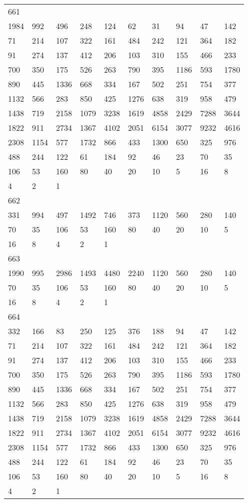 \begin{longtable}{*{10}{l}}
661&&&&&&&&&\\
1984& 992& 496& 248& 124& 62& 31& 94& 47& 142\\
71& 214& 107& 322& 161& 484& 242& 121& 364& 182\\
91& 274& 137& 412& 206& 103& 310& 155& 466& 233\\
700& 350& 175& 526& 263& 790& 395& 1186& 593& 1780\\
890& 445& 1336& 668& 334& 167& 502& 251& 754& 377\\
1132& 566& 283& 850& 425& 1276& 638& 319& 958& 479\\
1438& 719& 2158& 1079& 3238& 1619& 4858& 2429& 7288& 3644\\
1822& 911& 2734& 1367& 4102& 2051& 6154& 3077& 9232& 4616\\
2308& 1154& 577& 1732& 866& 433& 1300& 650& 325& 976\\
488& 244& 122& 61& 184& 92& 46& 23& 70& 35\\
106& 53& 160& 80& 40& 20& 10& 5& 16& 8\\
4& 2& 1& \\

662&&&&&&&&&\\
331& 994& 497& 1492& 746& 373& 1120& 560& 280& 140\\
70& 35& 106& 53& 160& 80& 40& 20& 10& 5\\
16& 8& 4& 2& 1& \\

663&&&&&&&&&\\
1990& 995& 2986& 1493& 4480& 2240& 1120& 560& 280& 140\\
70& 35& 106& 53& 160& 80& 40& 20& 10& 5\\
16& 8& 4& 2& 1& \\

664&&&&&&&&&\\
332& 166& 83& 250& 125& 376& 188& 94& 47& 142\\
71& 214& 107& 322& 161& 484& 242& 121& 364& 182\\
91& 274& 137& 412& 206& 103& 310& 155& 466& 233\\
700& 350& 175& 526& 263& 790& 395& 1186& 593& 1780\\
890& 445& 1336& 668& 334& 167& 502& 251& 754& 377\\
1132& 566& 283& 850& 425& 1276& 638& 319& 958& 479\\
1438& 719& 2158& 1079& 3238& 1619& 4858& 2429& 7288& 3644\\
1822& 911& 2734& 1367& 4102& 2051& 6154& 3077& 9232& 4616\\
2308& 1154& 577& 1732& 866& 433& 1300& 650& 325& 976\\
488& 244& 122& 61& 184& 92& 46& 23& 70& 35\\
106& 53& 160& 80& 40& 20& 10& 5& 16& 8\\
4& 2& 1& \\


\end{longtable}
